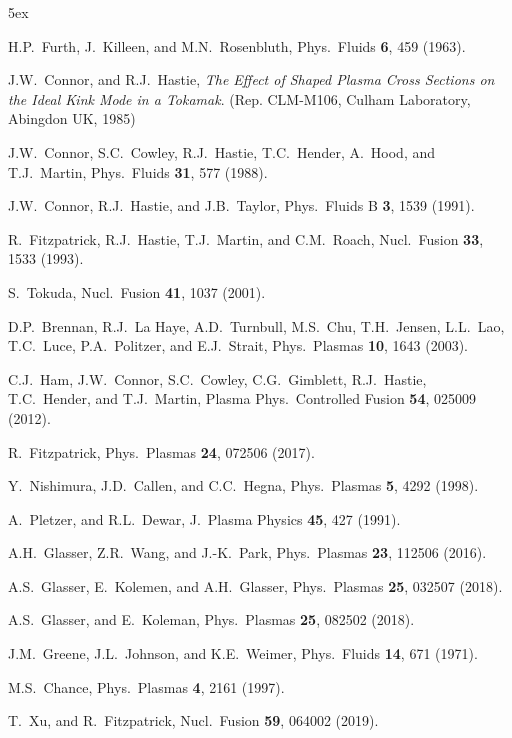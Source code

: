 \documentclass[12pt,prb,aps]{revtex4-1}
\begin{document}
\begin{thebibliography}{99}\baselineskip 5ex

 H.P.~Furth,  J.~Killeen, and M.N.~Rosenbluth,  Phys.\ Fluids {\bf 6}, 459 (1963).

 J.W.~Connor, and R.J.~Hastie, {\em The Effect of Shaped Plasma Cross Sections on the Ideal Kink Mode in a Tokamak}. (Rep. CLM-M106, Culham Laboratory, Abingdon UK, 1985)

 J.W.~Connor,  S.C.~Cowley, R.J.~Hastie,  T.C.~Hender,  A.~Hood, and T.J.~Martin,  Phys.\ Fluids {\bf 31}, 577 (1988).

 J.W.~Connor, R.J.~Hastie, and J.B.~Taylor, Phys.\ Fluids B {\bf 3}, 1539 (1991).

 R.~Fitzpatrick, R.J.~Hastie, T.J.~Martin, and C.M.~Roach, Nucl.\ Fusion {\bf 33}, 1533 (1993).

 S.~Tokuda, Nucl.\ Fusion {\bf 41}, 1037 (2001).

 D.P.~Brennan, R.J.~La Haye, A.D.~Turnbull, M.S.~Chu, T.H.~Jensen, L.L.~Lao, T.C.~Luce, P.A.~Politzer, and E.J.~Strait, Phys.\ Plasmas {\bf 10}, 1643 (2003).

 C.J.~Ham, J.W.~Connor, S.C.~Cowley, C.G.~Gimblett, R.J.~Hastie, T.C.~Hender, and T.J.~Martin, Plasma Phys.\ Controlled Fusion {\bf 54}, 025009 (2012). 

 R.~Fitzpatrick, Phys.\ Plasmas {\bf 24}, 072506 (2017). 

 Y.~Nishimura, J.D.~Callen, and C.C.~Hegna, Phys.\ Plasmas {\bf 5}, 4292 (1998).

 A.~Pletzer, and R.L.~Dewar, J.\ Plasma Physics {\bf 45}, 427 (1991).

 A.H.~Glasser, Z.R.~Wang, and J.-K.~Park, Phys.\ Plasmas {\bf 23}, 112506 (2016).

 A.S.~Glasser, E.~Kolemen, and A.H.~Glasser, Phys.\ Plasmas {\bf 25}, 032507 (2018).

 A.S.~Glasser, and E.~Koleman, Phys.\ Plasmas {\bf 25}, 082502 (2018). 

 J.M.~Greene, J.L.~Johnson, and K.E.~Weimer,  Phys.\  Fluids  {\bf 14}, 671 (1971).

 M.S.~Chance, Phys.\ Plasmas {\bf 4}, 2161 (1997).

 T.~Xu, and R.~Fitzpatrick, Nucl.\ Fusion {\bf 59}, 064002 (2019).


\end{thebibliography}
\end{document}
